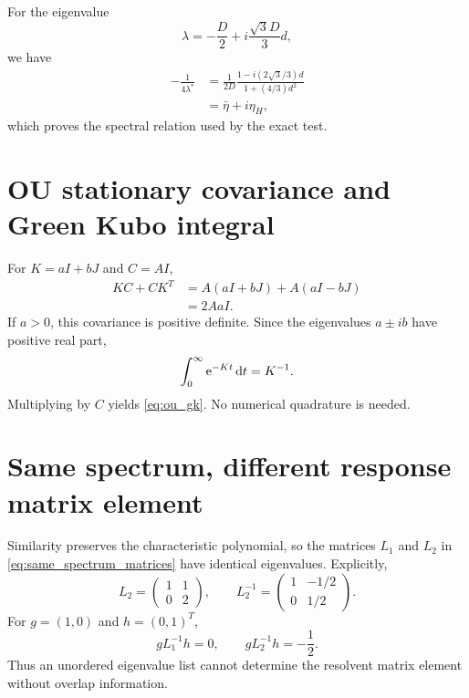 For the eigenvalue
\begin{equation}
 \lambda=-\frac{D}{2}+i\frac{\sqrt3D}{3}d,
\end{equation}
we have
\begin{align}
 -\frac1{4\lambda^*}
 &=\frac{1}{2D}\frac{1-i(2\sqrt3/3)d}{1+(4/3)d^2}\\
 &=\bar\eta+i\eta_H,
\end{align}
which proves the spectral relation used by the exact test.

\section{OU stationary covariance and Green Kubo integral}
For $K=aI+bJ$ and $C=AI$,
\begin{align}
 KC+CK^T
 &=A(aI+bJ)+A(aI-bJ)\\
 &=2AaI.
\end{align}
If $a>0$, this covariance is positive definite. Since the eigenvalues $a\pm ib$ have positive real part,
\begin{equation}
 \int_0^\infty \mathrm{e}^{-Kt}\,\mathrm{d} t=K^{-1}.
\end{equation}
Multiplying by $C$ yields \cref{eq:ou_gk}. No numerical quadrature is needed.

\section{Same spectrum, different response matrix element}
Similarity preserves the characteristic polynomial, so the matrices $L_1$ and $L_2$ in \cref{eq:same_spectrum_matrices} have identical eigenvalues. Explicitly,
\begin{equation}
 L_2=\begin{pmatrix}1&1\\0&2\end{pmatrix},
 \qquad
 L_2^{-1}=\begin{pmatrix}1&-1/2\\0&1/2\end{pmatrix}.
\end{equation}
For $g=(1,0)$ and $h=(0,1)^T$,
\begin{equation}
 gL_1^{-1}h=0,
 \qquad
 gL_2^{-1}h=-\frac12.
\end{equation}
Thus an unordered eigenvalue list cannot determine the resolvent matrix element without overlap information.
